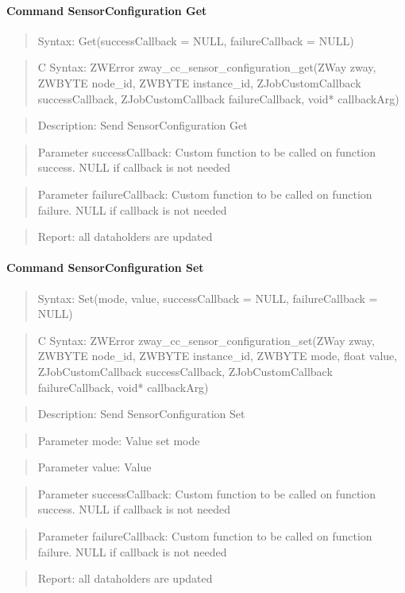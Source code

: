 \paragraph{Command SensorConfiguration Get}
\begin{quote}Syntax: Get(successCallback = NULL, failureCallback = NULL)\end{quote}
\begin{quote}C Syntax: ZWError zway\_cc\_sensor\_configuration\_get(ZWay zway, ZWBYTE node\_id, ZWBYTE instance\_id, ZJobCustomCallback successCallback, ZJobCustomCallback failureCallback, void* callbackArg)\end{quote}
\begin{quote}Description: Send SensorConfiguration Get\end{quote}
\begin{quote}Parameter successCallback: Custom function to be called on function success. NULL if callback is not needed\end{quote}
\begin{quote}Parameter failureCallback: Custom function to be called on function failure. NULL if callback is not needed\end{quote}
\begin{quote}Report: all dataholders are updated\end{quote}

\paragraph{Command SensorConfiguration Set}
\begin{quote}Syntax: Set(mode, value, successCallback = NULL, failureCallback = NULL)\end{quote}
\begin{quote}C Syntax: ZWError zway\_cc\_sensor\_configuration\_set(ZWay zway, ZWBYTE node\_id, ZWBYTE instance\_id, ZWBYTE mode, float value, ZJobCustomCallback successCallback, ZJobCustomCallback failureCallback, void* callbackArg)\end{quote}
\begin{quote}Description: Send SensorConfiguration Set\end{quote}
\begin{quote}Parameter mode: Value set mode\end{quote}
\begin{quote}Parameter value: Value\end{quote}
\begin{quote}Parameter successCallback: Custom function to be called on function success. NULL if callback is not needed\end{quote}
\begin{quote}Parameter failureCallback: Custom function to be called on function failure. NULL if callback is not needed\end{quote}
\begin{quote}Report: all dataholders are updated\end{quote}


